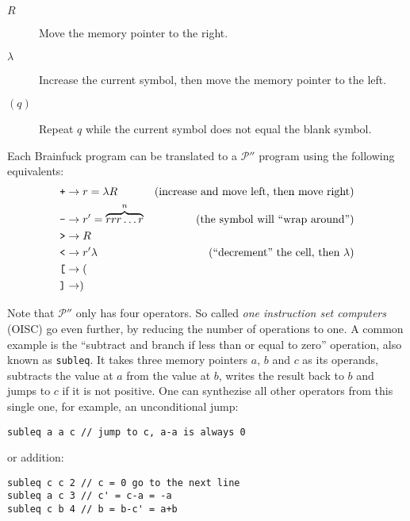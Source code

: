 \begin{description}
    \item[\boldmath$R$] Move the memory pointer to the right.
    \item[\boldmath$\lambda$] Increase the current symbol, then move the memory pointer to the left.
    \item[\boldmath$(q)$] Repeat $q$ while the current symbol does not equal the blank symbol.
\end{description}

Each Brainfuck program can be translated  to a $\mathcal{P}''$ program using the following equivalents:
\begin{align*}
    \text{\texttt{+}} &\rightarrow r = \lambda R &\text{(increase and move left, then move right)}\\
    \text{\texttt{-}} &\rightarrow r' = \overbrace{rrr\dots r}^n &\text{(the symbol will “wrap around”)}\\
    \text{\texttt{>}} &\rightarrow R\\
    \text{\texttt{<}} &\rightarrow r'\lambda &\text{(“decrement” the cell, then $\lambda$)}\\
    \text{\texttt{[}} &\rightarrow (\\
    \text{\texttt{]}} &\rightarrow )
\end{align*}


Note that $\mathcal{P}''$ only has four operators. So called \emph{one instruction set computers} (OISC) go even further, by reducing the number of operations to one. A common example is the “subtract and branch if less than or equal to zero” operation, also known as \texttt{subleq}. It takes three memory pointers $a$, $b$ and $c$ as its operands, subtracts the value at $a$ from the value at $b$, writes the result back to $b$ and jumps to $c$ if it is not positive. One can synthezise all other operators from this single one, for example, an unconditional jump:

\begin{lstlisting}
subleq a a c // jump to c, a-a is always 0
\end{lstlisting}

or addition:

\begin{lstlisting}
subleq c c 2 // c = 0 go to the next line
subleq a c 3 // c' = c-a = -a
subleq c b 4 // b = b-c' = a+b
\end{lstlisting}

